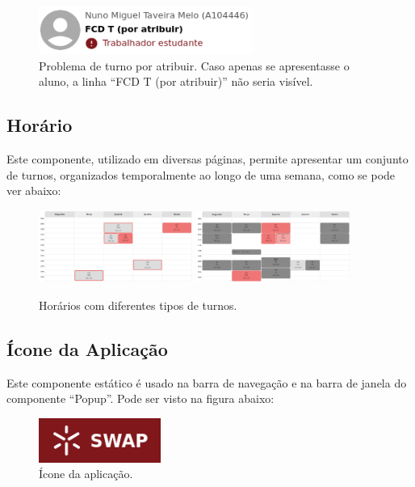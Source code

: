 \documentclass[12pt, a4paper]{article}
\begin{document}
\begin{figure}[H]
    \centering
    \includegraphics[width=7cm]{res/components/problem.png}
    \caption{
        \onehalfspacing
        Problema de turno por atribuir. Caso apenas se apresentasse o aluno, a linha
        ``FCD T (por atribuir)'' não seria visível.
    }
    \label{problem}
\end{figure}

\subsection{Horário}

Este componente, utilizado em diversas páginas, permite apresentar um conjunto de turnos,
organizados temporalmente ao longo de uma semana, como se pode ver abaixo:

\begin{figure}[H]
    \centering
    \includegraphics[width=0.45\textwidth]{res/components/schedule-1.png}
    \includegraphics[width=0.45\textwidth]{res/components/schedule-2.png}
    \caption{Horários com diferentes tipos de turnos.}
    \label{schedule}
\end{figure}

\subsection{Ícone da Aplicação}

Este componente estático é usado na barra de navegação e na barra de janela do componente ``Popup''.
Pode ser visto na figura abaixo:

\begin{figure}[H]
    \centering
    \includegraphics[width=4cm]{res/components/application-icon.png}
    \caption{Ícone da aplicação.}
    \label{application-icon}
\end{figure}
\end{document}
